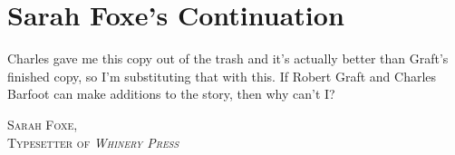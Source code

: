 \chapter{Sarah Foxe's Continuation}
Charles gave me this copy out of the trash and it's actually better than Graft's finished copy, so I'm substituting that with this.
If Robert Graft and Charles Barfoot can make additions to the story, then why can't I?
\begin{flushright}
\textsc{
Sarah Foxe,\\
Typesetter of \emph{Whinery Press}}
\end{flushright}


